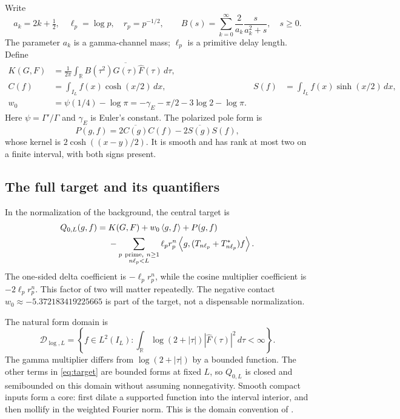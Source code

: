 \documentclass[11pt]{article}
\numberwithin{equation}{section}
\theoremstyle{definition}
\theoremstyle{remark}
\newcommand{\R}{\mathbb R}
\newcommand{\ip}[2]{\left\langle#1,#2\right\rangle}
\begin{document}
Write
\begin{equation}
 a_k=2k+\tfrac12,\quad \ell_p=\log p,\quad r_p=p^{-1/2},
 \qquad B(s)=\sum_{k=0}^\infty\frac2{a_k}\frac{s}{a_k^2+s},\quad s\ge0.
 \label{eq:B}
\end{equation}
The parameter $a_k$ is a gamma-channel mass; $\ell_p$ is a primitive delay length. Define
\begin{align}
 K(G,F)&=\frac1{2\pi}\int_\R B(\tau^2)
          \overline{\widehat G(\tau)}\widehat F(\tau)\,d\tau,\label{eq:K}\\
 C(f)&=\int_{I_L}f(x)\cosh(x/2)\,dx,
 &S(f)&=\int_{I_L}f(x)\sinh(x/2)\,dx,\label{eq:poles}\\
 w_0&=\psi(1/4)-\log\pi
 =-\gamma_E-\pi/2-3\log2-\log\pi.
\end{align}
Here $\psi=\Gamma'/\Gamma$ and $\gamma_E$ is Euler's constant. The polarized pole form is
\begin{equation}
 P(g,f)=2\overline{C(g)}C(f)-2\overline{S(g)}S(f),
 \label{eq:P}
\end{equation}
whose kernel is $2\cosh((x-y)/2)$. It is smooth and has rank at most two on a finite interval, with both signs present.

\subsection{The full target and its quantifiers}
In the normalization of the background, the central target is
\begin{align}
 Q_{0,L}(g,f)={}&K(G,F)+w_0\ip{g}{f}+P(g,f)\notag\\
 &-\sum_{\substack{p\ \mathrm{prime},\ n\ge1\\n\ell_p<L}}
 \ell_pr_p^n\ip{g}{(T_{n\ell_p}+T_{n\ell_p}^*)f}.
 \label{eq:target}
\end{align}
The one-sided delta coefficient is $-\ell_pr_p^n$, while the cosine multiplier coefficient is $-2\ell_pr_p^n$. This factor of two will matter repeatedly. The negative contact $w_0\approx-5.372183419225665$ is part of the target, not a dispensable normalization.

The natural form domain is
\begin{equation}
 \mathcal D_{\log,L}=
 \left\{f\in L^2(I_L):\int_\R\log(2+|\tau|)
 |\widehat F(\tau)|^2\,d\tau<\infty\right\}.
 \label{eq:domain}
\end{equation}
The gamma multiplier differs from $\log(2+|\tau|)$ by a bounded function. The other terms in \eqref{eq:target} are bounded forms at fixed $L$, so $Q_{0,L}$ is closed and semibounded on this domain without assuming nonnegativity. Smooth compact inputs form a core: first dilate a supported function into the interval interior, and then mollify in the weighted Fourier norm. This is the domain convention of \cite{background}.
\end{document}
